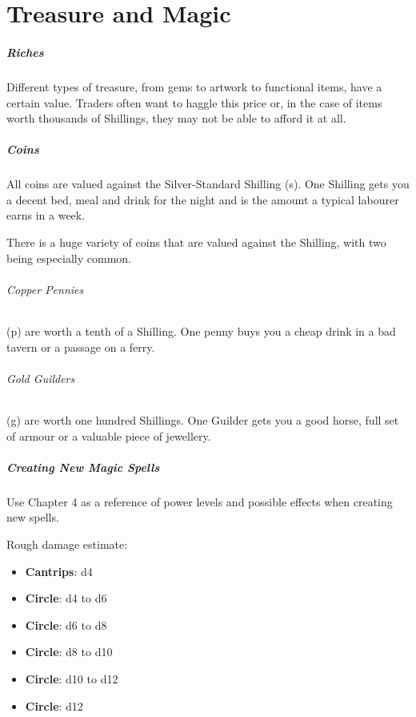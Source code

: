 \documentclass[itdr]{subfiles}
\begin{document}
\chapter{Treasure and Magic}

\paragraph{Riches}
Different types of treasure, from gems to artwork to functional items, have a certain value. Traders often want to haggle this price or, in the case of items worth thousands of Shillings, they may not be able to afford it at all.

\paragraph{Coins}
All coins are valued against the Silver-Standard Shilling (s). One Shilling gets you a decent bed, meal and drink for the night and is the amount a typical labourer earns in a week.

There is a huge variety of coins that are valued against the Shilling, with two being especially common.

\subparagraph{Copper Pennies} (p) are worth a tenth of a Shilling. One penny buys you a cheap drink in a bad tavern or a passage on a ferry.

\subparagraph{Gold Guilders} (g) are worth one hundred Shillings. One Guilder gets you a good horse, full set of armour or a valuable piece of jewellery.

\paragraph{Creating New Magic Spells}
Use Chapter 4 as a reference of power levels and possible effects when creating new spells.

Rough damage estimate:
\begin{itemize}
	\item \textbf{Cantrips}: d4
	\item \textbf{ Circle}: d4 to d6
	\item \textbf{ Circle}: d6 to d8
	\item \textbf{ Circle}: d8 to d10
	\item \textbf{ Circle}: d10 to d12
	\item \textbf{ Circle}: d12
\end{itemize}
\end{document}
